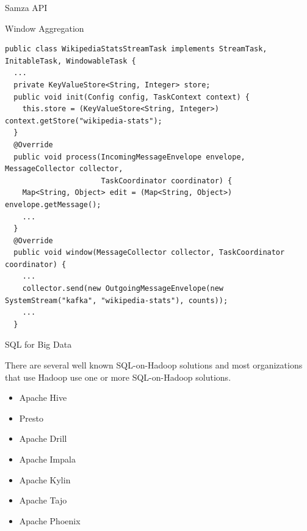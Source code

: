 \documentclass[newPxFont]{beamer}
\begin{document}

\begin{frame}[fragile]{Samza API}
\begin{exampleblock}{Window Aggregation}
\begin{verbatim}
public class WikipediaStatsStreamTask implements StreamTask, InitableTask, WindowableTask {
  ...
  private KeyValueStore<String, Integer> store;
  public void init(Config config, TaskContext context) {
    this.store = (KeyValueStore<String, Integer>) context.getStore("wikipedia-stats");
  }
  @Override
  public void process(IncomingMessageEnvelope envelope, MessageCollector collector, 
                      TaskCoordinator coordinator) {
    Map<String, Object> edit = (Map<String, Object>) envelope.getMessage();
    ...
  }
  @Override
  public void window(MessageCollector collector, TaskCoordinator coordinator) {
    ...
    collector.send(new OutgoingMessageEnvelope(new SystemStream("kafka", "wikipedia-stats"), counts));
    ...
  }
\end{verbatim}
\end{exampleblock}

\end{frame}



\begin{frame}{SQL for Big Data}

There are several well known SQL-on-Hadoop solutions and most organizations that use Hadoop use one or more SQL-on-Hadoop solutions.

\begin{itemize}
	\item Apache Hive
	\item Presto
	\item Apache Drill
	\item Apache Impala
	\item Apache Kylin
	\item Apache Tajo
	\item Apache Phoenix
\end{itemize}

\end{frame}


\end{document}
